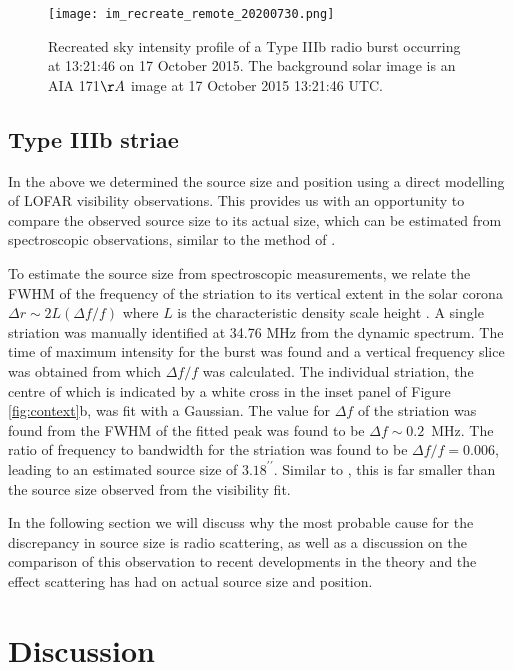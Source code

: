 \begin{figure}
    \centering
    \texttt{[image: im\_recreate\_remote\_20200730.png]}
    \caption[Recreated sky intensity profile of a Type IIIb radio burst]{Recreated sky intensity profile of a Type IIIb radio burst occurring at 13:21:46 on 17 October 2015. The background solar image is an AIA 171$\AA$ image at 17 October 2015 13:21:46 UTC.} 
    \label{fig:recreate}
\end{figure}


\subsection{Type IIIb striae}
In the above we determined the source size and position using a direct modelling of LOFAR visibility observations. This provides us with an opportunity to compare the observed source size to its actual size, which can be estimated from spectroscopic observations, similar to the method of \cite{Kontar2017}.

To estimate the source size from spectroscopic measurements, we relate the FWHM of the frequency of the striation to its vertical extent in the solar corona $\Delta r {\sim} 2L \left(\Delta f/f\right)$ where $L$ is the characteristic density scale height \citep{Kontar2017}.
A single striation was manually identified at 34.76 MHz from the dynamic spectrum. The time of maximum intensity for the burst was found and a vertical frequency slice was obtained from which $\Delta f/f$ was calculated. The individual striation, the centre of which is indicated by a white cross in the inset panel of Figure \ref{fig:context}b, was fit with a Gaussian. The value for $\Delta f$ of the striation was found from the FWHM of the fitted peak was found to be $\Delta f \sim 0.2$~MHz. The ratio of frequency to bandwidth for the striation was found to be $\Delta f/f = 0.006$, leading to an estimated source size of $3.18^{\prime\prime}$. 
Similar to \cite{Kontar2017}, this is far smaller than the source size observed from the visibility fit.

In the following section we will discuss why the most probable cause for the discrepancy in source size is radio scattering, as well as a discussion on the comparison of this observation to recent developments in the theory and the effect scattering has had on actual source size and position.

\section{Discussion}\label{sec:conclusion}

